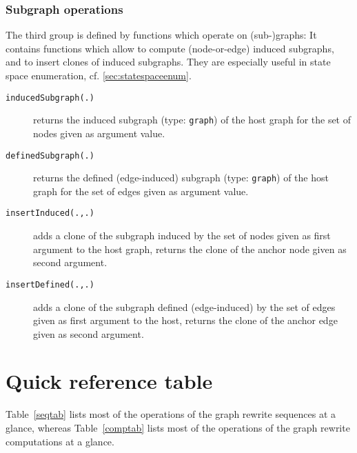 \subsubsection*{Subgraph operations}
The third group is defined by functions which operate on (sub-)graphs:
It contains functions which allow to compute (node-or-edge) induced subgraphs, and to insert clones of induced subgraphs.
They are especially useful in state space enumeration, cf. \ref{sec:statespaceenum}.

\begin{description}
\item[\texttt{inducedSubgraph(.)}] returns the induced subgraph (type: \texttt{graph}) of the host graph for the set of nodes given as argument value.
\item[\texttt{definedSubgraph(.)}] returns the defined (edge-induced) subgraph (type: \texttt{graph}) of the host graph for the set of edges given as argument value.
\item[\texttt{insertInduced(.,.)}] adds a clone of the subgraph induced by the set of nodes given as first argument to the host graph, returns the clone of the anchor node given as second argument.
\item[\texttt{insertDefined(.,.)}] adds a clone of the subgraph defined (edge-induced) by the set of edges given as first argument to the host, returns the clone of the anchor edge given as second argument.
\end{description}


\section{Quick reference table}

Table~\ref{seqtab} lists most of the operations of the graph rewrite sequences at a glance,
whereas Table~\ref{comptab} lists most of the operations of the graph rewrite computations at a glance.

